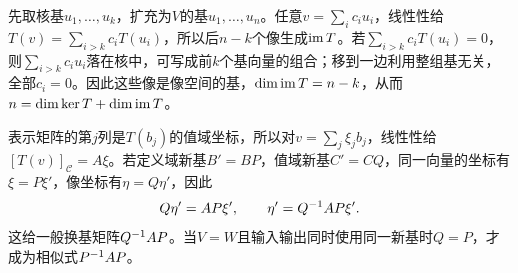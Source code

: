 \label{der:7-2}
先取核基$u_1,\ldots,u_k$，扩充为$V$的基$u_1,\ldots,u_n$。任意$v=\sum_i c_iu_i$，线性性给$T(v)=\sum_{i>k}c_iT(u_i)$，所以后$n-k$个像生成$\operatorname{im} T$。若$\sum_{i>k}c_iT(u_i)=0$，则$\sum_{i>k}c_iu_i$落在核中，可写成前$k$个基向量的组合；移到一边利用整组基无关，全部$c_i=0$。因此这些像是像空间的基，$\dim\operatorname{im} T=n-k$，从而$n=\dim\ker T+\dim\operatorname{im} T$。

表示矩阵的第$j$列是$T(b_j)$的值域坐标，所以对$v=\sum_j\xi_jb_j$，线性性给$[T(v)]_\mathcal C=A\xi$。若定义域新基$B'=BP$，值域新基$C'=CQ$，同一向量的坐标有$\xi=P\xi'$，像坐标有$\eta=Q\eta'$，因此
\[Q\eta'=AP\xi',\qquad\eta'=Q^{-1} AP\xi'.\]
这给一般换基矩阵$Q^{-1} AP$。当$V=W$且输入输出同时使用同一新基时$Q=P$，才成为相似式$P^{-1} AP$。
